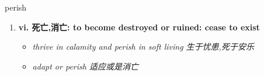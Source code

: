 
\begin{frame}
{\huge perish}
\begin{center}
\begin{enumerate}\Large
  \item \textbf{vi. 死亡,消亡: to become destroyed or ruined: cease to exist}
  \begin{itemize}
    \item \em{\Large{thrive in calamity and perish in soft living 生于忧患,死于安乐}}
    \item \em{\Large{adapt or perish 适应或是消亡}}
  \end{itemize}
\end{enumerate}
\end{center}
\end{frame}
